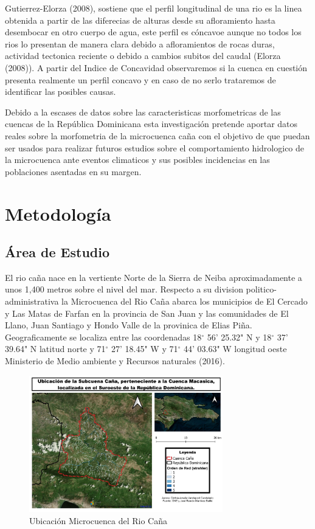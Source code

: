 \documentclass[11pt,]{article}
\begin{document}
Gutierrez-Elorza (2008), sostiene que el perfil longitudinal de una rio
es la linea obtenida a partir de las diferecias de alturas desde su
afloramiento hasta desembocar en otro cuerpo de agua, este perfil es
cóncavoe aunque no todos los rios lo presentan de manera clara debido a
afloramientos de rocas duras, actividad tectonica reciente o debido a
cambios subitos del caudal (Elorza (2008)). A partir del Indice de
Concavidad observaremos si la cuenca en cuestión presenta realmente un
perfil concavo y en caso de no serlo trataremos de identificar las
posibles causas.

Debido a la escases de datos sobre las caracteristicas morfometricas de
las cuencas de la República Dominicana esta investigación pretende
aportar datos reales sobre la morfometria de la microcuenca caña con el
objetivo de que puedan ser usados para realizar futuros estudios sobre
el comportamiento hidrologico de la microcuenca ante eventos climaticos
y sus posibles incidencias en las poblaciones asentadas en su margen.

\section{Metodología}\label{metodologuxeda}

\subsection{Área de Estudio}\label{uxe1rea-de-estudio}

El rio caña nace en la vertiente Norte de la Sierra de Neiba
aproximadamente a unos 1,400 metros sobre el nivel del mar. Respecto a
su division politico-administrativa la Microcuenca del Rio Caña abarca
los municipios de El Cercado y Las Matas de Farfan en la provincia de
San Juan y las comunidades de El Llano, Juan Santiago y Hondo Valle de
la provinica de Elias Piña. Geograficamente se localiza entre las
coordenadas 18\(^\circ\) 56' 25.32" N y 18\(^\circ\) 37' 39.64" N
latitud norte y 71\(^\circ\) 27' 18.45" W y 71\(^\circ\) 44' 03.63" W
longitud oeste Ministerio de Medio ambiente y Recursos naturales (2016).

\begin{figure}
\centering
\includegraphics[width=0.75000\textwidth]{mapa_de_subcuenca_cana.jpg}
\caption{Ubicación Microcuenca del Rio Caña}
\end{figure}
\end{document}
